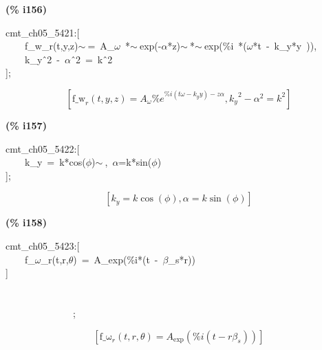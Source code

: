 \documentclass[fleqn]{article}
\begin{document}
\noindent
\begin{minipage}[t]{4.000000em}\color{red}\bfseries
(\% i156)	
\end{minipage}
\begin{minipage}[t]{\textwidth}\color{blue}
cmt\_ch05\_5421:[\\
\ \ \ \ f\_w\_r(t,y,z)\ensuremath{\sim\ }=\ A\_\ensuremath{\omega}\ *\ensuremath{\sim\ }exp(-\ensuremath{\alpha}*z)\ensuremath{\sim\ }*\ensuremath{\sim\ }exp(\%i\ *(\ensuremath{\omega}*t\ -\ k\_y*y\ )),\\
\ \ \ \ k\_y\^\ 2\ -\ \ensuremath{\alpha}\^\ 2\ =\ k\^\ 2\\
];
\end{minipage}
\[\displaystyle \tag{\% o156} 
\left[ {{\ensuremath{\mathrm{f\_ w}}}_r}\left( t\operatorname{,}y\operatorname{,}z\right) ={A_{\omega }} {{\% e}^{\% i \left( t \omega -{k_y} y\right) -z \alpha }}\operatorname{,}{{{k_y}}^{2}}-{{\alpha }^{2}}={{k}^{2}}\right] \mbox{}
\]


\noindent
\begin{minipage}[t]{4.000000em}\color{red}\bfseries
(\% i157)	
\end{minipage}
\begin{minipage}[t]{\textwidth}\color{blue}
cmt\_ch05\_5422:[\\
\ \ \ \ k\_y\ =\ k*cos(\ensuremath{\phi})\ensuremath{\sim\ },\ \ensuremath{\alpha}=k*sin(\ensuremath{\phi})\\
];
\end{minipage}
\[\displaystyle \tag{\% o157} 
\left[ {k_y}=k \cos{\left( \phi \right) }\operatorname{,}\alpha =k \sin{\left( \phi \right) }\right] \mbox{}
\]


\noindent
\begin{minipage}[t]{4.000000em}\color{red}\bfseries
(\% i158)	
\end{minipage}
\begin{minipage}[t]{\textwidth}\color{blue}
cmt\_ch05\_5423:[\\
\ \ \ \ f\_\ensuremath{\omega}\_r(t,r,\ensuremath{\theta})\ =\ A\_exp(\%i*(t\ -\ \ensuremath{\beta}\_s*r))\\
]\ \ \ \ \ \ \ \ \ \ \ \ \ \ \ \ \ \ \ \ \ \ \ \ \ \ \ \ \ \ \ \ \ \ \ \ \ \ \ \ \ \ \ \ \ \ \ \ \ \ \ \ \ \ \ \ \ \ \ \ \ \ \ \ \ \ \ \ \ \ \ \ \ \ \ \ \ \ \ \ \ \ \ \ \ \ \ \ \ \ \ \ \ \ \ \ \ \ \ \ \ \ \ \ \ \ \ \ \ \ \ \ \ \ \ \ \ \ \ \ \ \ \ \ \ \ \ \ \ \ \ \ \ \ \ \ \ \ \ \ \ \ \ \ \ \ \ \ \ \ \ \ \ \ \ \ \ \ \ \ \ \ \ \ \ \ \ \ \ \ \ \ \ \ \ \ \ \ \ \ \ \ \ \ \ \ \ \ \ \ \ \ \ \ \ \ \ \ \ \ \ \ \ \ \ \ \ \ \ \ \ \ \ \ \ \ \ \ \ \ \ \ \ \ \ \ \ \ \ ;
\end{minipage}
\[\displaystyle \tag{\% o158} 
\left[ {{\ensuremath{\mathrm{f\_ \omega }}}_r}\left( t\operatorname{,}r\operatorname{,}\theta \right) ={A_{\ensuremath{\mathrm{exp}}}}\left( \% i \left( t-r {{\beta }_s}\right) \right) \right] \mbox{}
\]
\end{document}
